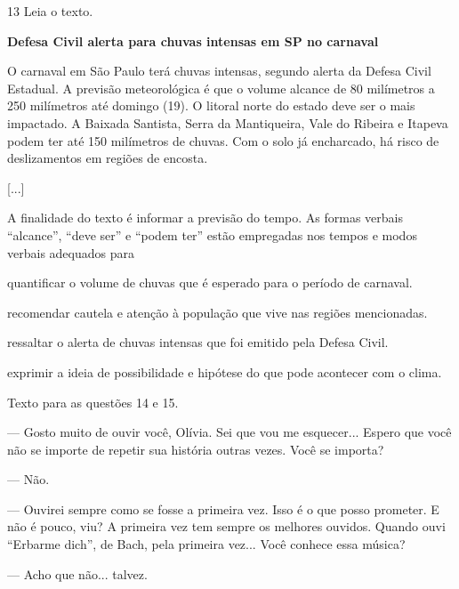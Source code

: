 \pagebreak

\num{13} Leia o texto.

\begin{myquote}
\textbf{Defesa Civil alerta para chuvas intensas em SP no carnaval}

O carnaval em São Paulo terá chuvas intensas, segundo alerta da Defesa
Civil Estadual. A previsão meteorológica é que o volume alcance de 80
milímetros a 250 milímetros até domingo (19). O litoral norte do estado
deve ser o mais impactado. A Baixada Santista, Serra da Mantiqueira,
Vale do Ribeira e Itapeva podem ter até 150 milímetros de chuvas. Com o
solo já encharcado, há risco de deslizamentos em regiões de encosta.

{[}...{]}

\end{myquote}

A finalidade do texto é informar a previsão do tempo. As formas verbais ``alcance'', ``deve ser'' e ``podem ter'' estão empregadas nos tempos e modos verbais adequados para

\begin{escolha}
\item quantificar o volume de chuvas que é esperado para o período de carnaval.

\item recomendar cautela e atenção à população que vive nas regiões mencionadas.

\item ressaltar o alerta de chuvas intensas que foi emitido pela Defesa
Civil.

\item exprimir a ideia de possibilidade e hipótese do que pode acontecer
com o clima.
\end{escolha}

Texto para as questões 14 e 15.

\begin{myquote}
--- Gosto muito de ouvir você, Olívia. Sei que vou me esquecer... Espero
que você não se importe de repetir sua história outras vezes. Você se
importa?

--- Não.

--- Ouvirei sempre como se fosse a primeira vez. Isso é o que posso
prometer. E não é pouco, viu? A primeira vez tem sempre os melhores
ouvidos. Quando ouvi ``Erbarme dich'', de Bach, pela primeira vez...
Você conhece essa música?

--- Acho que não... talvez.

\end{myquote}

